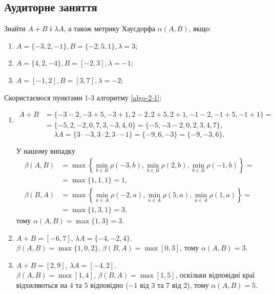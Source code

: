 \subsection{Аудиторне заняття}

\begin{problem}
	Знайти $A + B$ і $\lambda A$, а також метрику Хаусдорфа $\alpha (A, B)$, якщо:
	
	\begin{enumerate}
	    \item $A = \{-3, 2, -1\},  B = \{-2, 5, 1\},  \lambda = 3$;
	    
	    \item $A = \{4, 2, -4\},  B = [-2, 3],  \lambda = -1$;
	    
	    \item $A = [-1, 2],  B = [3, 7],  \lambda = -2$;	    
	\end{enumerate}
	
\end{problem}

\begin{solution}
	Скористаємося пунктами 1-3 алгоритму \ref{algo-2-1}:
	\begin{enumerate}
	    \item \begin{align*} A + B &= \{-3-2, -3+5, -3+1, 2-2, 2+5, 2+1, -1-2, -1+5, -1+1\} =\\&= \{-5,2,-2,0,7,3,-3,4,0\}=\{-5,-3-2,0,2,3,4,7\},\end{align*}
	    \[ \lambda A = \{3 \cdot -3, 3 \cdot 2, 3 \cdot -1 \} = \{-9,6,-3\}=\{-9,-3,6\}.\]
	    
	    У нашому випадку \begin{align*}\beta (A, B) &= \max\left\{\min_{b\in B} \rho(-3,b), \min_{b\in B} \rho(2,b), \min_{b\in B} \rho(-1,b)\right\}=\\&=\max\{1,1,1\}=1, \\ \beta (B, A) &= \max\left\{\min_{a\in A} \rho(-2,a), \min_{a\in A} \rho(5,a), \min_{a\in A} \rho(1,a)\right\}=\\&=\max\{1,3,1\}=3,\end{align*} тому $\alpha (A, B) = \max\{1,3\}=3$.
	    
	    \item $A + B = [-6,7]$, $\lambda A = \{-4, -2, 4 \}$.\\
	    
	 	$\beta (A, B) = \max\{1, 0, 2\}$, $\beta (B, A) = \max[0, 3]$, тому $\alpha (A, B) = 3$.
	    
	    \item $A + B = [2,9]$, $\lambda A = [-4,2]$. \\
	    
	    $\beta (A, B) = \max[1,4]$, $\beta (B, A) = \max[1, 5]$, оскільки відповідні краї відхиляються на $4$ та $5$ відповідно ($-1$ від $3$ та $7$ від $2$), тому $\alpha (A, B) = 5$.
	\end{enumerate}
\end{solution}

